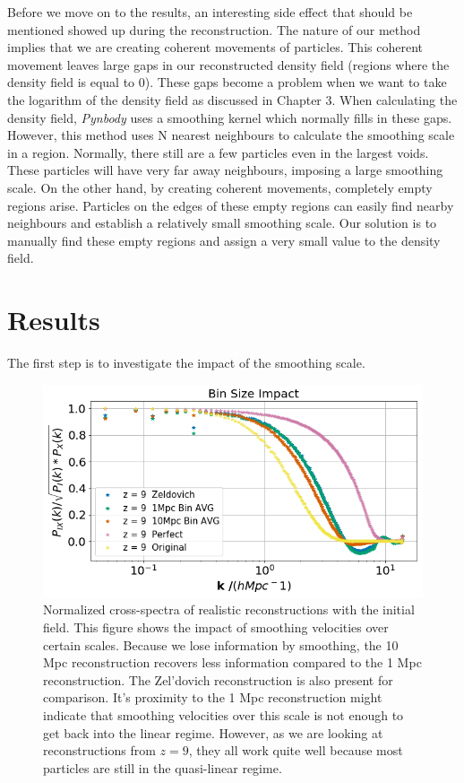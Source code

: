Before we move on to the results, an interesting side effect that should be mentioned showed up during the reconstruction. The nature of our method implies that we are creating coherent movements of particles. This coherent movement leaves large gaps in our reconstructed density field (regions where the density field is equal to 0). These gaps become a problem when we want to take the logarithm of the density field as discussed in Chapter 3. When calculating the density field, \textit{Pynbody} uses a smoothing kernel which normally fills in these gaps. However, this method uses N nearest neighbours to calculate the smoothing scale in a region. Normally, there still are a few particles even in the largest voids. These particles will have very far away neighbours, imposing a large smoothing scale. On the other hand, by creating coherent movements, completely empty regions arise. Particles on the edges of these empty regions can easily find nearby neighbours and establish a relatively small smoothing scale. Our solution is to manually find these empty regions and assign a very small value to the density field. 

\section{Results}

The first step is to investigate the impact of the smoothing scale.

\begin{figure}
    \centering
    \includegraphics[width=1\columnwidth]{images/realRecon/binSize.png}%
    
    \caption{
    Normalized cross-spectra of realistic reconstructions with the initial field. This figure shows the impact of smoothing velocities over certain scales. Because we lose information by smoothing, the 10 Mpc reconstruction recovers less information compared to the 1 Mpc reconstruction. The Zel'dovich reconstruction is also present for comparison. It's proximity to the 1 Mpc reconstruction might indicate that smoothing velocities over this scale is not enough to get back into the linear regime. However, as we are looking at reconstructions from $z=9$, they all work quite well because most particles are still in the quasi-linear regime.
    }
    
    \label{fig:temp}
\end{figure}


